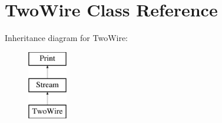 \hypertarget{class_two_wire}{}\section{Two\+Wire Class Reference}
\label{class_two_wire}
Inheritance diagram for Two\+Wire\+:\begin{figure}[H]
\begin{center}
\leavevmode
\includegraphics[height=3.000000cm]{class_two_wire}
\end{center}
\end{figure}
